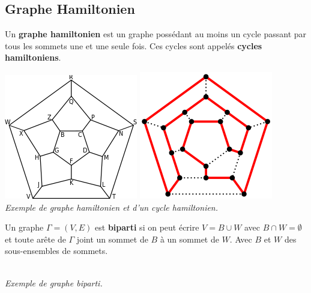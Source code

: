 \documentclass[11pt]{article}
\begin{document}
	\subsection{Graphe Hamiltonien}
		Un \textbf{graphe hamiltonien} est un graphe possédant au moins un cycle passant par tous les sommets une et une seule fois. Ces cycles sont appelés \textbf{cycles hamiltoniens}.
		\begin{center}
			\includegraphics[scale=0.6]{hamiltonien.png}
			\qquad
			\includegraphics[scale=0.57]{hamiltonien2.png}\\
			\textit{Exemple de graphe hamiltonien et d'un cycle hamiltonien.}
		\end{center}
		
		Un graphe $\Gamma = (V,E)$ est \textbf{biparti} si on peut écrire $V = B \cup W$ avec $B \cap W = \emptyset$ et toute arête de $\Gamma$ joint un sommet de $B$ à un sommet de $W$. Avec $B$ et $W$ des sous-ensembles de sommets. %
		\begin{center}
			 \\
		\textit{Exemple de graphe biparti.}
		\end{center}
			
\end{document}
